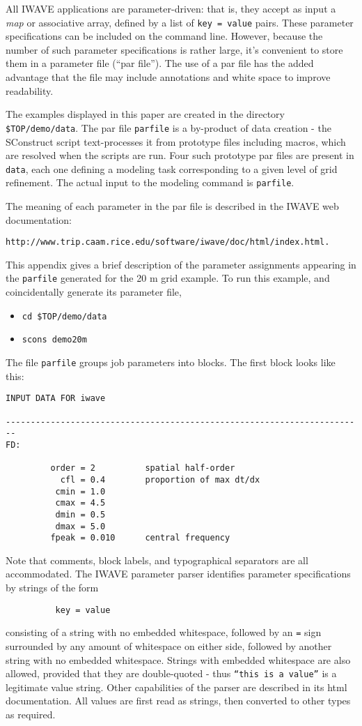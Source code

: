 
All IWAVE applications are parameter-driven: that is, they accept as
input a {\em map} or associative array, defined by 
a list of {\tt key = value} pairs. These parameter specifications can
be included on the command line. However, because the number of such
parameter specifications is rather large, it's convenient to store
them in a parameter file (``par file''). The use of a par file has the
added advantage that the file may include annotations and white space to
improve readability. 

The examples displayed in this paper are created in the directory {\tt
  \$TOP/demo/data}. The par file {\tt parfile} is a by-product of data
creation - the SConstruct script text-processes it from prototype
files including macros, which are resolved when the scripts are
run. Four such prototype par files are present in {\tt data}, each one defining
a modeling task corresponding to a given level of grid refinement. 
The actual input to the modeling command is {\tt parfile}. 

The meaning of each parameter in the par file is described in the IWAVE
web documentation:
\begin{verbatim}
http://www.trip.caam.rice.edu/software/iwave/doc/html/index.html.
\end{verbatim}
This appendix gives a brief description of the parameter assignments
appearing in the {\tt parfile} generated for the 20 m grid example. To
run this example, and coincidentally generate its parameter file,
\begin{itemize}
\item {\tt cd \$TOP/demo/data}
\item {\tt scons demo20m}
\end{itemize}

The file {\tt parfile} groups job parameters into blocks. The first
block looks like this:
\begin{verbatim}
INPUT DATA FOR iwave

------------------------------------------------------------------------
FD:

         order = 2          spatial half-order
           cfl = 0.4        proportion of max dt/dx
          cmin = 1.0
          cmax = 4.5
          dmin = 0.5
          dmax = 5.0
         fpeak = 0.010      central frequency

\end{verbatim}
Note that comments, block labels, and typographical separators are all
accommodated. The IWAVE parameter parser identifies parameter
specifications by strings of the form 
\begin{verbatim}
          key = value
\end{verbatim}
consisting of a string with no embedded whitespace, followed by an
{\tt =} sign surrounded by any amount of whitespace on either side,
followed by another string with no embedded whitespace. Strings with embedded
whitespace are also allowed, provided that they are double-quoted -
thus {\tt ``this is a value''} is a legitimate value string. Other
capabilities of the parser are described in its html
documentation. All values are first read as strings, then
converted to other types as required.

